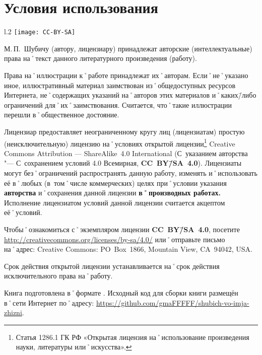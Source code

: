 ﻿%
\chapter{Условия использования}

\begin{wrapfigure}{l}{.2\textwidth}
\centering
\texttt{[image: CC-BY-SA]}
\label{fig:CC-BY-SA}
\end{wrapfigure}

\noindent М.\,П.~Шубичу (автору, лицензиару) принадлежат авторские (интеллектуальные) права на˚текст данного литературного произведения (работу). 

\noindent Права на˚иллюстрации к˚работе принадлежат их˚авторам. Если˚не˚указано иное, иллюстративный материал заимствован из˚общедоступных ресурсов Интернета, не˚содержащих указаний на˚авторов этих материалов и˚каких\=/либо ограничений для˚их˚заимствования. Считается, что˚такие иллюстрации перешли в˚общественное достояние.

Лицензиар предоставляет неограниченному кругу лиц (лицензиатам) простую (неисключительную) лицензию на˚условиях открытой лицензии\footnote
{Статья 1286.1 ГК РФ «Открытая лицензия на˚использование произведения науки, литературы или˚искусства».}
\foreignlanguage{english}{Creative Commons Attribution --- ShareAlike~4.0 International} (С~указанием авторства "--- С~сохранением условий 4.0 Всемирная, \textbf{CC~BY\=/SA~4.0}). Лицензиаты могут без˚ограничений распространять данную работу, изменять и˚использовать её в˚любых (в~том˚числе коммерческих) целях при˚условии указания \textbf{авторства} и˚сохранения данной лицензии \textbf{в˚производных работах.}
Исполнение лицензиатом условий данной лицензии считается акцептом её˚условий.

Чтобы˚ознакомиться с˚экземпляром лицензии \textbf{CC~BY\=/SA~4.0}, посетите \url{http://creativecommons.org/licenses/by-sa/4.0/} или˚отправьте письмо на˚адрес: \foreignlanguage{english}{Creative Commons: PO~Box~1866, Mountain View, CA~94042, USA.}{\sloppy

}%

Срок действия открытой лицензии устанавливается на˚срок действия исключительного права на˚работу.

Книга подготовлена в˚формате \LaTeXe{}. Исходный код для сборки книги размещён в˚сети Интернет по˚адресу: \url{https://github.com/gmaFFFFF/shubich-vo-imja-zhizni}.{\sloppy

}%

